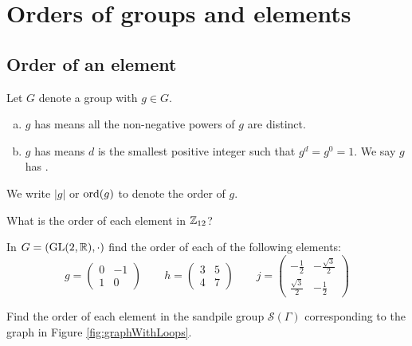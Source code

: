 \documentclass[../algebraNotesMSRI-UP2016.tex]{subfiles}
\begin{document}
\section[\S \thesection]{Orders of groups and elements}
\subsection[\subsecname]{Order of an element}
\begin{frame}{\subsecname}
\begin{dfn}
Let $G$ denote a group with $g\in G$.
\begin{enumerate}[(a)]
\item $g$ has  means all the non-negative powers of $g$ are distinct.
\item $g$ has  means $d$ is the smallest positive integer such that $g^d=g^0=1$.  We say $g$ has .
\end{enumerate} 

\smallGap
We write $|g|$ or $\operatorname{ord}(g)$ to denote the order of $g$.
\end{dfn}

\smallGap
\begin{que}[cf. Problem 54]
What is the order of each element in $\mathbb Z_{12}$?
\end{que}
\end{frame}

\begin{frame}[c]
\begin{exe}[cf. Problem 53]\label{exe:prob53}
In $G=(\operatorname{GL}(2,\mathbb R),\cdot)$ find the order of each of the following elements:
\[
g=\begin{pmatrix}
	0 & -1 \\
	1 & 0 
	\end{pmatrix}
\qquad
h=\begin{pmatrix}
	3 & 5 \\
	4 & 7
	\end{pmatrix}
\qquad 
j=\begin{pmatrix}
	-\frac{1}{2} & -\frac{\sqrt 3}{2} \\
	\frac{\sqrt 3}{2} & -\frac{1}{2}
	\end{pmatrix}
\]
\end{exe}

\smallGap
\begin{exe}[cf. Problem 55]\label{exe:prob55}
Find the order of each element in the sandpile group $\mathscr S(\Gamma)$ corresponding to the graph in Figure \ref{fig:graphWithLoops}. 
\end{exe}
\end{frame}
\end{document}
